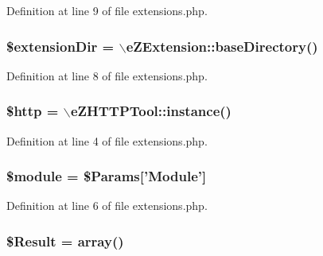\-Definition at line 9 of file extensions.\-php.

\hypertarget{extensions_8php_a511fe73f345235dca8dfab597f398521}{
\subsubsection[{\$extension\-Dir}]{\setlength{\rightskip}{0pt plus 5cm}\$extension\-Dir = $\backslash$e\-Z\-Extension\-::base\-Directory()}}\label{extensions_8php_a511fe73f345235dca8dfab597f398521}


\-Definition at line 8 of file extensions.\-php.

\hypertarget{extensions_8php_a775fc1707a7fa92aaa1c663c289dbbbc}{
\subsubsection[{\$http}]{\setlength{\rightskip}{0pt plus 5cm}\$http = $\backslash$e\-Z\-H\-T\-T\-P\-Tool\-::instance()}}\label{extensions_8php_a775fc1707a7fa92aaa1c663c289dbbbc}


\-Definition at line 4 of file extensions.\-php.

\hypertarget{extensions_8php_ac531301c55a8d8b6c7613597218ff482}{
\subsubsection[{\$module}]{\setlength{\rightskip}{0pt plus 5cm}\$module = \$\-Params\mbox{[}'\-Module'\mbox{]}}}\label{extensions_8php_ac531301c55a8d8b6c7613597218ff482}


\-Definition at line 6 of file extensions.\-php.

\hypertarget{extensions_8php_a390d5702f3c15330fd764dbf08d5b2db}{
\subsubsection[{\$\-Result}]{\setlength{\rightskip}{0pt plus 5cm}\$\-Result = array()}}\label{extensions_8php_a390d5702f3c15330fd764dbf08d5b2db}


